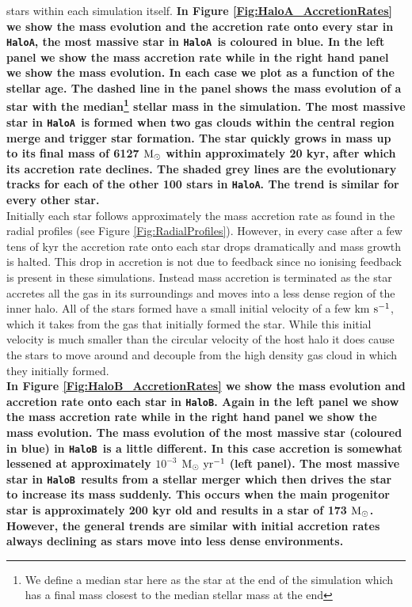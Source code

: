 \documentclass[twocolumn,iop,revtex4]{openjournal}
\newcommand{\kms} {km $\rm{s^{-1}}$}
\newcommand{\msolar} {$\rm{M_{\odot}}~$}
\newcommand{\msolarc} {$\rm{M_{\odot}}$}
\newcommand{\msolaryr} {$\rm{M_{\odot}~yr^{-1}}~$}
\newcommand{\ha} {\texttt{HaloA~}}
\newcommand{\hb} {\texttt{HaloB~}}
\newcommand{\hac} {\texttt{HaloA}}
\newcommand{\hbc} {\texttt{HaloB}}
\begin{document}
stars within each simulation itself. \textbf{In Figure \ref{Fig:HaloA_AccretionRates} we show the mass evolution and
the accretion rate onto every star in \hac, the most massive star in \ha is coloured in blue.
In the left panel we show the mass accretion rate while in the right hand panel we show the mass evolution.
In each case we plot as a function of the stellar age. The dashed line in the panel shows the mass evolution
of a star with the median\footnote{We define a
        median star here as the star at the end of the simulation which has a final mass
        closest to the median stellar mass at the end} stellar mass in the simulation.
The most massive star in \ha is formed
when two gas clouds within the central region merge and trigger star formation. The star quickly
grows in mass up to its final mass of 6127 \msolar within approximately 20 kyr, after which
its accretion rate declines. The shaded grey lines are the evolutionary tracks for each of the
other 100 stars in \hac. The trend is similar for every other star.\\} 
\indent Initially each star follows approximately the mass accretion rate as found in the radial profiles (see Figure \ref{Fig:RadialProfiles}).
However, in every case after a few tens of kyr the accretion rate onto each star drops dramatically and mass growth is halted.
This drop in accretion is not due to feedback since no ionising feedback
is present in these simulations. Instead mass accretion is terminated as the star accretes all the gas in
its surroundings and moves into a less dense region of the inner halo. All of the stars formed have a small initial velocity of a few \kms,
which it takes from the gas that initially formed the star. While this 
initial velocity is much smaller than the circular
velocity of the host halo it does cause the stars to move around and decouple from the high density gas cloud in which they initially formed. \\
\indent \textbf{In Figure \ref{Fig:HaloB_AccretionRates} we show the mass evolution and accretion rate onto each star in \hbc.
  Again in the left panel we show the mass accretion rate while in the right hand panel we show the mass evolution.
  The mass evolution of the most massive star (coloured in blue) in \hb is a little different. In this case accretion is somewhat lessened
  at approximately $10^{-3}$ \msolaryr (left panel). The most
  massive star in \hb results from a stellar merger which then drives the star to increase its mass suddenly. This occurs
  when the main progenitor star is approximately 200 kyr old and results in a star of 173 \msolarc. However, the general
trends are similar with initial accretion rates always declining as stars move into less dense environments.}\\
\end{document}
